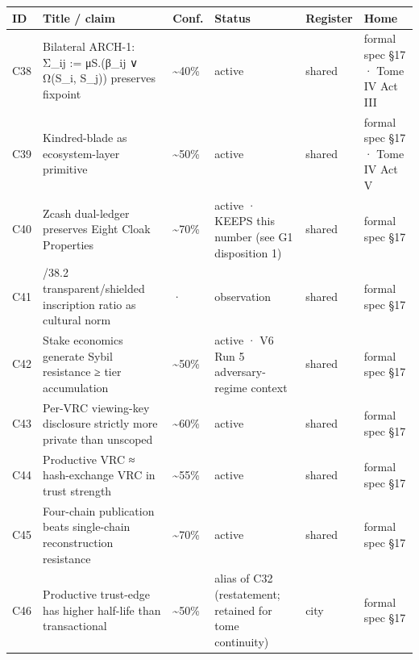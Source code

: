 \documentclass[
]{article}
\newcounter{none} %
\begin{document}
{\def\LTcaptype{none} %
\begin{longtable}[]{@{}
  >{\raggedright\arraybackslash}p{}
  >{\raggedright\arraybackslash}p{}
  >{\raggedright\arraybackslash}p{}
  >{\raggedright\arraybackslash}p{}
  >{\raggedright\arraybackslash}p{}
  >{\raggedright\arraybackslash}p{}@{}}
\toprule\noalign{}
\begin{minipage}[b]{\linewidth}\raggedright
ID
\end{minipage} & \begin{minipage}[b]{\linewidth}\raggedright
Title / claim
\end{minipage} & \begin{minipage}[b]{\linewidth}\raggedright
Conf.
\end{minipage} & \begin{minipage}[b]{\linewidth}\raggedright
Status
\end{minipage} & \begin{minipage}[b]{\linewidth}\raggedright
Register
\end{minipage} & \begin{minipage}[b]{\linewidth}\raggedright
Home
\end{minipage} \\
\midrule\noalign{}
\endhead
\bottomrule\noalign{}
\endlastfoot
C38 & Bilateral ARCH-1: Σ\_ij := μS.(β\_ij ∨ Ω(S\_i, S\_j)) preserves
fixpoint & \textasciitilde40\% & active & shared & formal spec §17 ·
Tome IV Act III \\
C39 & Kindred-blade as ecosystem-layer primitive & \textasciitilde50\% &
active & shared & formal spec §17 · Tome IV Act V \\
C40 & Zcash dual-ledger preserves Eight Cloak Properties &
\textasciitilde70\% & active · KEEPS this number (see G1 disposition 1)
& shared & formal spec §17 \\
C41 & 61.8/38.2 transparent/shielded inscription ratio as cultural norm
& · & observation & shared & formal spec §17 \\
C42 & Stake economics generate Sybil resistance ≥ tier accumulation &
\textasciitilde50\% & active · V6 Run 5 adversary-regime context &
shared & formal spec §17 \\
C43 & Per-VRC viewing-key disclosure strictly more private than unscoped
& \textasciitilde60\% & active & shared & formal spec §17 \\
C44 & Productive VRC ≈ hash-exchange VRC in trust strength &
\textasciitilde55\% & active & shared & formal spec §17 \\
C45 & Four-chain publication beats single-chain reconstruction
resistance & \textasciitilde70\% & active & shared & formal spec §17 \\
C46 & Productive trust-edge has higher half-life than transactional &
\textasciitilde50\% & alias of C32 (restatement; retained for tome
continuity) & city & formal spec §17 \\
\end{longtable}
}
\end{document}
